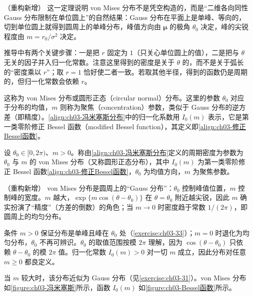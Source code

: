 \documentclass[../../main.tex]{subfiles}
\begin{document}
\begin{remark}（重构新增）
这一定理说明 von Mises 分布不是凭空构造的，而是“二维各向同性 Gauss 分布限制在单位圆上”的自然结果：Gauss 分布在平面上是单峰、等向的，切到单位圆上就得到圆周上的单峰分布，峰值方向由 $\boldsymbol{\mu}$ 的极角 $\theta_0$ 决定，峰的尖锐程度由 $m=r_0/\sigma^{2}$ 决定。

推导中有两个关键步骤：一是把 $r$ 固定为 $1$（只关心单位圆上的值），二是把与 $\theta$ 无关的因子并入归一化常数。注意这里得到的密度是关于 $\theta$ 的，而不是关于弧长的“密度乘以 $r$”；取 $r=1$ 恰好使二者一致。若取其他半径，得到的函数仍是周期的，但归一化常数会依赖 $r$。
\end{remark}

这称为 von Mises 分布或圆形正态（circular normal）分布。这里的参数 $\theta_0$ 对应于分布的均值，$m$ 则称为聚焦（concentration）参数，类似于 Gauss 分布的逆方差（即精度）。\eqref{align:ch03-冯米塞斯分布}中的归一化系数用 $I_0(m)$ 表示，它是第一类零阶修正 Bessel 函数（modified Bessel function），其定义即\eqref{align:ch03-修正Bessel函数}。

\begin{definition}\label{definition:ch03-冯米塞斯分布}
设 $\theta_0\in[0,2\pi)$、$m>0$。称由\eqref{align:ch03-冯米塞斯分布}定义的周期密度为参数为 $\theta_0$ 与 $m$ 的 von Mises 分布（又称圆形正态分布），其中 $I_0(m)$ 为第一类零阶修正 Bessel 函数\eqref{align:ch03-修正Bessel函数}，$\theta_0$ 为均值方向，$m$ 为聚焦参数。
\end{definition}

\begin{remark}（重构新增）
von Mises 分布是圆周上的“Gauss 分布”：$\theta_0$ 控制峰值位置，$m$ 控制峰的宽度。$m$ 越大，$\exp\{m\cos(\theta-\theta_0)\}$ 在 $\theta=\theta_0$ 附近越尖锐，因此 $m$ 确实扮演了“精度”（方差的倒数）的角色；当 $m\to0$ 时密度趋于常数 $1/(2\pi)$，即圆周上的均匀分布。

条件 $m>0$ 保证分布是单峰且峰在 $\theta_0$ 处（\cref{exercise:ch03-33}）；$m=0$ 时退化为均匀分布，$\theta_0$ 不再可辨识。$\theta_0$ 的取值范围按模 $2\pi$ 理解，因为 $\cos(\theta-\theta_0)$ 只依赖 $\theta-\theta_0$ 的模 $2\pi$ 值。归一化常数 $I_0(m)>0$ 对一切 $m$ 成立，因此分布对任意 $m\geqslant0$ 都良定义。
\end{remark}

当 $m$ 较大时，该分布近似为 Gauss 分布（见\cref{exercise:ch03-31}）。von Mises 分布如\cref{figure:ch03-冯米塞斯}所示，函数 $I_0(m)$ 如\cref{figure:ch03-Bessel函数}所示。
\end{document}
